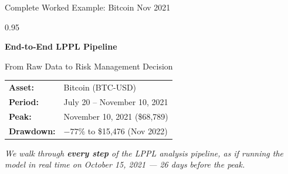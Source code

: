\documentclass[9pt, aspectratio=169, t]{beamer}
\begin{document}
\begin{frame}{Complete Worked Example: Bitcoin Nov 2021}
    \begin{cminipage}{0.95\textwidth}
    \begin{center}
        {\LARGE\color{MainBlue}\textbf{End-to-End LPPL Pipeline}}

        \vspace{6mm}
        {\large From Raw Data to Risk Management Decision}

        \vspace{6mm}
        {\footnotesize
        \begin{tabular}{ll}
            \textbf{Asset:} & Bitcoin (BTC-USD) \\
            \textbf{Period:} & July 20 -- November 10, 2021 \\
            \textbf{Peak:} & November 10, 2021 (\$68{,}789) \\
            \textbf{Drawdown:} & $-77\%$ to \$15{,}476 (Nov 2022) \\
        \end{tabular}
        }

        \vspace{6mm}
        \textit{We walk through \textbf{every step} of the LPPL analysis pipeline, as if running the model in real time on October 15, 2021 --- 26 days before the peak.}
    \end{center}
    \end{cminipage}
\end{frame}
\end{document}
